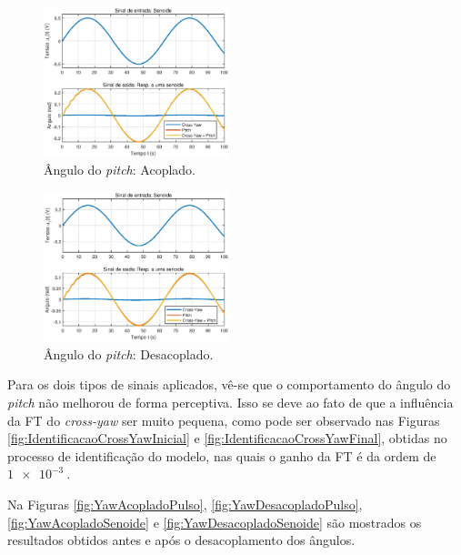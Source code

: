 \begin{figure}[H]
    \centering
    \includegraphics[width=0.48\textwidth]{figures/Desacoplamento/Pitch_Acoplado_Senoide.eps}
    \caption{Ângulo do \textit{pitch}: Acoplado.}
    \label{fig:PitchAcopladoSenoide}
\end{figure}

\begin{figure}[H]
    \centering
    \includegraphics[width=0.48\textwidth]{figures/Desacoplamento/Pitch_Desacoplado_Senoide.eps}
    \caption{Ângulo do \textit{pitch}: Desacoplado.}
    \label{fig:PitchDesacopladoSenoide}
\end{figure}

Para os dois tipos de sinais aplicados, vê-se que o comportamento do ângulo do \textit{pitch} não melhorou de forma perceptiva. Isso se deve ao fato de que a influência da FT do \textit{cross-yaw} ser muito pequena, como pode ser observado nas Figuras \ref{fig:IdentificacaoCrossYawInicial} e \ref{fig:IdentificacaoCrossYawFinal}, obtidas no processo de identificação do modelo, nas quais o ganho da FT é da ordem de $\SI{1e-3}{}$.


Na Figuras \ref{fig:YawAcopladoPulso}, \ref{fig:YawDesacopladoPulso}, \ref{fig:YawAcopladoSenoide} e \ref{fig:YawDesacopladoSenoide} são mostrados os resultados obtidos antes e após o desacoplamento dos ângulos.


